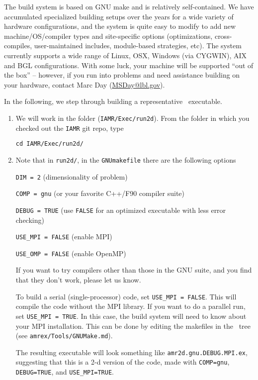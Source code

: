 The build system is based on GNU make and is relatively self-contained.  We have accumulated 
specialized building setups over the years for a wide variety of hardware configurations, and 
the system is quite easy to modify to add new machine/OS/compiler types and site-specific 
options (optimizations, cross-compiles, user-maintained includes, module-based strategies, etc).
The system currently supports a wide range of Linux, OSX, Windows (via CYGWIN), AIX and BGL 
configurations. With some luck, your machine will be supported ``out of the box'' -- however, if 
you run into problems and need assistance building on your hardware, contact Marc Day (\url{MSDay@lbl.gov}).

In the following, we step through building a representative \iamr\ executable.
\begin{enumerate}
\item We will work in the folder ({\tt IAMR/Exec/run2d}).
From the folder in which you checked out the {\tt IAMR} git repo, type
\begin{verbatim}
cd IAMR/Exec/run2d/
\end{verbatim}

\item Note that in {\tt run2d/}, in the {\tt GNUmakefile} there are the following options

{\tt DIM = 2} (dimensionality of problem)

{\tt COMP = gnu} (or your favorite C++/F90 compiler suite)

{\tt DEBUG = TRUE} (use {\tt FALSE} for an optimized executable with less error checking)

{\tt USE\_MPI = FALSE} (enable MPI)

{\tt USE\_OMP = FALSE} (enable OpenMP)

If you want to try compilers other than those in the GNU suite, and you find that they don't
work, please let us know.

To build a serial (single-processor) code, set {\tt USE\_MPI = FALSE}.
This will compile the code without the MPI library.  If you want to do
a parallel run, set {\tt USE\_MPI = TRUE}.  In this
case, the build system will need to know about your MPI installation.
This can be done by editing the makefiles in the \amrex\ tree
(see {\tt amrex/Tools/GNUMake.md}).

The resulting executable will look something like {\tt amr2d.gnu.DEBUG.MPI.ex},
suggesting that this is a 2-d version of the code, made with 
{\tt COMP=gnu}, {\tt DEBUG=TRUE}, and {\tt USE\_MPI=TRUE}.

\end{enumerate}


